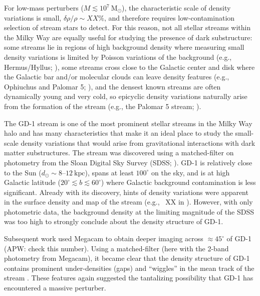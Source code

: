\documentclass[12pt, modern]{aastex62}
\newcommand{\msun}{\textrm{M}_\odot}
\begin{document}
For low-mass perturbers ($M \lesssim 10^7~\msun$), the characteristic scale of density variations is small, $\delta\rho / \rho \sim XX\%$, and therefore requires low-contamination selection of stream stars to detect.
For this reason, not all stellar streams within the Milky Way are equally useful for studying the presence of dark substructure: some streams lie in regions of high background density where measuring small density variations is limited by Poisson variations of the background (e.g., Hermus/Hyllus; \citealt{Grillmair:2014}), some streams cross close to the Galactic center and disk where the Galactic bar and/or molecular clouds can leave density features (e.g., Ophiuchus and Palomar 5; \citealt{Price-Whelan:2016, Pearson:2017, Amorisco:2016}), and the densest known streams are often dynamically young and very cold, so epicyclic density variations naturally arise from the formation of the stream (e.g., the Palomar 5 stream; \citealt{Kupper:2008, Kupper:2015}).

The GD-1 stream \citep{Grillmair:2006, Price-Whelan:2018} is one of the most prominent stellar streams in the Milky Way halo and has many characteristics that make it an ideal place to study the small-scale density variations that would arise from gravitational interactions with dark matter substructures.
The stream was discovered using a matched-filter on photometry from the Sloan Digital Sky Survey (SDSS; \citealt{SDSS, TODO}).
GD-1 is relatively close to the Sun ($d_\odot \sim 8$--$12~\textrm{kpc}$), spans at least $100^\circ$ on the sky, and is at high Galactic latitude ($20^\circ \lesssim b \lesssim 60^\circ$) where Galactic background contamination is less significant.
Already with its discovery, hints of density variations were apparent in the surface density and map of the stream (e.g., \figurename~XX in \citealt{Grillmair:2006}).
However, with only photometric data, the background density at the limiting magnitude of the SDSS was too high to strongly conclude about the density structure of GD-1.

Subsequent work used Megacam to obtain deeper imaging across $\approx 45^\circ$ of GD-1 (APW: check this number).
Using a matched-filter (here with the 2-band photometry from Megacam), it became clear that the density structure of GD-1 contains prominent under-densities (gaps) and ``wiggles'' in the mean track of the stream \citep{deBoer:2018}.
These features again suggested the tantalizing possibility that GD-1 has encountered a massive perturber.
\end{document}
